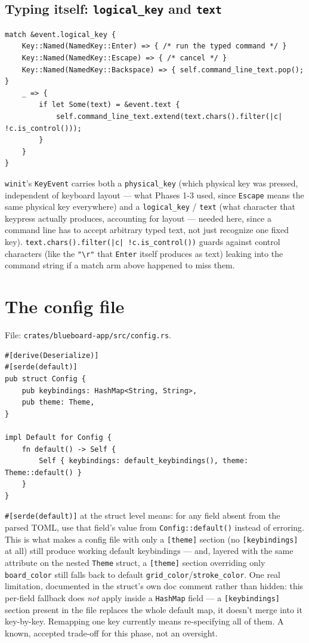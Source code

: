 \documentclass[11pt]{article}
\begin{document}
\subsection{Typing itself: \texttt{logical\_key} and \texttt{text}}
\begin{lstlisting}
match &event.logical_key {
    Key::Named(NamedKey::Enter) => { /* run the typed command */ }
    Key::Named(NamedKey::Escape) => { /* cancel */ }
    Key::Named(NamedKey::Backspace) => { self.command_line_text.pop(); }
    _ => {
        if let Some(text) = &event.text {
            self.command_line_text.extend(text.chars().filter(|c| !c.is_control()));
        }
    }
}
\end{lstlisting}
\texttt{winit}'s \texttt{KeyEvent} carries both a \texttt{physical\_key} (which physical
key was pressed, independent of keyboard layout — what Phases 1-3 used, since
\texttt{Escape} means the same physical key everywhere) and a \texttt{logical\_key} /
\texttt{text} (what character that keypress actually produces, accounting for layout —
needed here, since a command line has to accept arbitrary typed text, not just recognize
one fixed key). \texttt{text.chars().filter(|c| !c.is\_control())} guards against control
characters (like the \texttt{"\textbackslash r"} that \texttt{Enter} itself produces as
text) leaking into the command string if a match arm above happened to miss them.

\section{The config file}
\label{sec:config}
File: \texttt{crates/blueboard-app/src/config.rs}.
\begin{lstlisting}
#[derive(Deserialize)]
#[serde(default)]
pub struct Config {
    pub keybindings: HashMap<String, String>,
    pub theme: Theme,
}

impl Default for Config {
    fn default() -> Self {
        Self { keybindings: default_keybindings(), theme: Theme::default() }
    }
}
\end{lstlisting}
\texttt{\#[serde(default)]} at the struct level means: for any field absent from the parsed
TOML, use that field's value from \texttt{Config::default()} instead of erroring. This is
what makes a config file with only a \texttt{[theme]} section (no \texttt{[keybindings]} at
all) still produce working default keybindings — and, layered with the same attribute on
the nested \texttt{Theme} struct, a \texttt{[theme]} section overriding only
\texttt{board\_color} still falls back to default \texttt{grid\_color}/\texttt{stroke\_color}.
One real limitation, documented in the struct's own doc comment rather than hidden: this
per-field fallback does \emph{not} apply inside a \texttt{HashMap} field — a
\texttt{[keybindings]} section present in the file replaces the whole default map, it
doesn't merge into it key-by-key. Remapping one key currently means re-specifying all of
them. A known, accepted trade-off for this phase, not an oversight.
\end{document}
